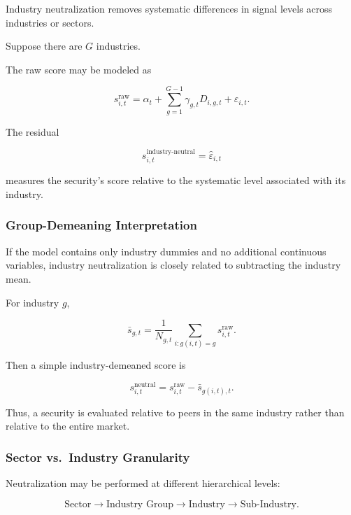 \documentclass[11pt,a4paper]{article}
\begin{document}
Industry neutralization removes systematic differences in signal levels across
industries or sectors.

Suppose there are $G$ industries.

The raw score may be modeled as

\begin{equation}
s_{i,t}^{\mathrm{raw}}
=
\alpha_t
+
\sum_{g=1}^{G-1}
\gamma_{g,t}
D_{i,g,t}
+
\varepsilon_{i,t}.
\end{equation}

The residual

\begin{equation}
\boxed{
s_{i,t}^{\mathrm{industry\text{-}neutral}}
=
\widehat{\varepsilon}_{i,t}
}
\end{equation}

measures the security's score relative to the systematic level associated with
its industry.


\subsubsection{Group-Demeaning Interpretation}

If the model contains only industry dummies and no additional continuous
variables, industry neutralization is closely related to subtracting the
industry mean.

For industry $g$,

\begin{equation}
\bar{s}_{g,t}
=
\frac{
1
}{
N_{g,t}
}
\sum_{i:g(i,t)=g}
s_{i,t}^{\mathrm{raw}}.
\end{equation}

Then a simple industry-demeaned score is

\begin{equation}
\boxed{
s_{i,t}^{\mathrm{neutral}}
=
s_{i,t}^{\mathrm{raw}}
-
\bar{s}_{g(i,t),t}.
}
\end{equation}

Thus, a security is evaluated relative to peers in the same industry rather
than relative to the entire market.


\subsubsection{Sector vs.\ Industry Granularity}

Neutralization may be performed at different hierarchical levels:

\begin{equation}
\text{Sector}
\rightarrow
\text{Industry Group}
\rightarrow
\text{Industry}
\rightarrow
\text{Sub-Industry}.
\end{equation}
\end{document}
